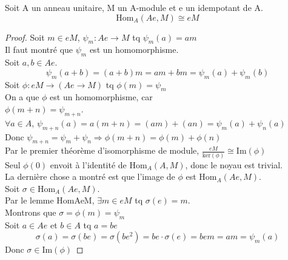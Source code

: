 \begin{lemma}[HomAeMisoeM]
    \label{HomAeMisoeM}
    Soit A un anneau unitaire, M un A-module et e un idempotant de A.
    \[ \text{Hom}_{A}(A e,M) \cong e M\]
\end{lemma}
\begin{proof}
    Soit $m \in e M$, $\psi_{m} : A e \to M$ tq $\psi_{m}(a) = a m$\\
    Il faut montré que $\psi_{m}$ est un homomorphisme.\\
    Soit $a,b \in A e$.\\
    \[ \psi_{m}(a+b) = (a+b)m = a m + b m = \psi_{m}(a) + \psi_{m}(b) \]
    Soit $\phi : e M \to (A e \to M)$ tq $\phi(m) = \psi_{m}$\\
    On a que $\phi$ est un homomorphisme, car\\
    $\phi(m+n) = \psi_{m+n}$.\\
    $\forall a \in A$, $\psi_{m+n}(a) = a (m+n) = (a m) + (a n) = \psi_{m}(a)+\psi_{n}(a)$\\
    Donc $\psi_{m+n} = \psi_{m}+\psi_{n} \Rightarrow \phi(m+n) = \phi(m)+\phi(n)$\\
    Par le premier théorème d'isomorphisme de module, $\frac{e M}{\text{ker}(\phi)} \cong \text{Im}(\phi)$\\
    Seul $\phi(0)$ envoit à l'identité de $\text{Hom}_{A}(A,M)$, donc le noyau est trivial.\\
    La dernière chose a montré est que l'image de $\phi$ est $\text{Hom}_{A}(A e,M)$.\\
    Soit $\sigma \in \text{Hom}_{A}(A e,M)$.\\
    Par le lemme HomAeM, $\exists m \in eM$ tq $\sigma(e) = m$.\\
    Montrons que $\sigma = \phi(m) = \psi_{m}$\\
    Soit $a \in Ae$ et $b \in A$ tq $a= b e$\\
    \[ \sigma(a) = \sigma (b e) = \sigma(b e^{2}) = b e \cdot \sigma(e) = b e m = a m = \psi_{m}(a) \]
    Donc $\sigma \in \text{Im}(\phi)$
\end{proof}

